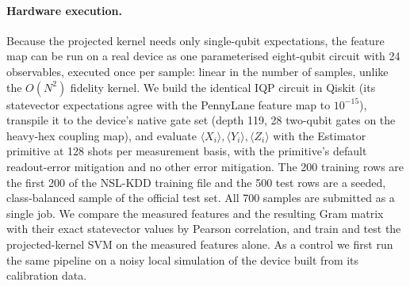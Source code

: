 \paragraph{Hardware execution.} Because the projected kernel needs only single-qubit expectations, the
feature map can be run on a real device as one parameterised eight-qubit circuit with 24 observables,
executed once per sample: linear in the number of samples, unlike the $O(N^{2})$ fidelity kernel. We
build the identical IQP circuit in Qiskit (its statevector expectations agree with the PennyLane feature
map to $10^{-15}$), transpile it to the device's native gate set (depth 119, 28 two-qubit gates on the
heavy-hex coupling map), and evaluate $\langle X_i\rangle,\langle Y_i\rangle,\langle Z_i\rangle$ with the
Estimator primitive at 128 shots per measurement basis, with the primitive's default readout-error
mitigation and no other error mitigation. The 200 training rows are the first 200 of the NSL-KDD training
file and the 500 test rows are a seeded, class-balanced sample of the official test set. All 700 samples
are submitted as a single job. We compare the measured features and the resulting Gram matrix with their
exact statevector values by Pearson correlation, and train and test the projected-kernel SVM on the
measured features alone. As a control we first run the same pipeline on a noisy local simulation of the
device built from its calibration data.
